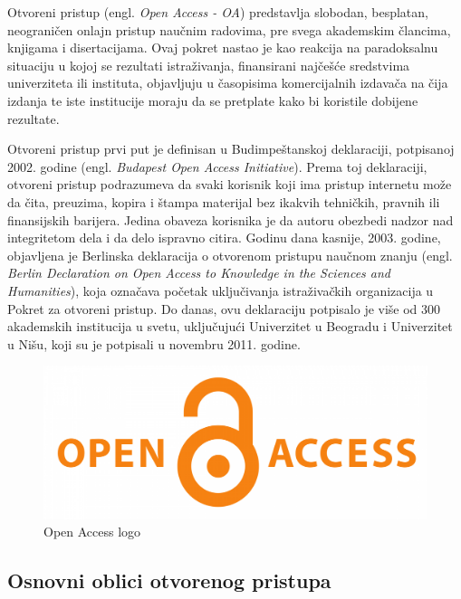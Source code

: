 \documentclass{article}
\begin{document}
Otvoreni pristup (engl. \textit{Open Access - OA}) predstavlja slobodan, besplatan, neograničen onlajn pristup naučnim radovima, pre svega akademskim člancima, knjigama i disertacijama\cite{suber2012access}. Ovaj pokret nastao je kao reakcija na paradoksalnu situaciju u kojoj se rezultati istraživanja, finansirani najčešće sredstvima univerziteta ili instituta, objavljuju u časopisima komercijalnih izdavača na čija izdanja te iste institucije moraju da se pretplate kako bi koristile dobijene rezultate\cite{willinsky2011academic}.

Otvoreni pristup prvi put je definisan u Budimpeštanskoj deklaraciji, potpisanoj 2002. godine (engl. \textit{Budapest Open Access Initiative})\cite{suber2012access}. Prema toj deklaraciji, otvoreni pristup podrazumeva da svaki korisnik koji ima pristup internetu može da čita, preuzima, kopira i štampa materijal bez ikakvih tehničkih, pravnih ili finansijskih barijera. Jedina obaveza korisnika je da autoru obezbedi nadzor nad integritetom dela i da delo ispravno citira. Godinu dana kasnije, 2003. godine, objavljena je Berlinska deklaracija o otvorenom pristupu naučnom znanju (engl. \textit{Berlin Declaration on Open Access to Knowledge in the Sciences and Humanities}), koja označava početak uključivanja istraživačkih organizacija u Pokret za otvoreni pristup. Do danas, ovu deklaraciju potpisalo je više od 300 akademskih institucija u svetu, uključujući Univerzitet u Beogradu i Univerzitet u Nišu, koji su je potpisali u novembru 2011. godine.

\begin{figure}[htbp]
    \center
    \includegraphics[scale=0.15]{img/open-access-logo.png}
    \caption{Open Access logo}
\end{figure}

\subsection{Osnovni oblici otvorenog pristupa}
\end{document}
